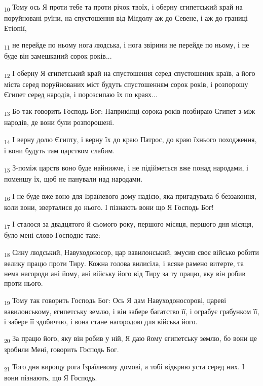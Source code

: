\begin{tcolorbox}
\textsubscript{10} Тому ось Я проти тебе та проти річок твоїх, і оберну єгипетський край на поруйновані руїни, на спустошення від Міґдолу аж до Севене, і аж до границі Етіопії,
\end{tcolorbox}
\begin{tcolorbox}
\textsubscript{11} не перейде по ньому нога людська, і нога звірини не перейде по ньому, і не буде він замешканий сорок років...
\end{tcolorbox}
\begin{tcolorbox}
\textsubscript{12} І оберну Я єгипетський край на спустошення серед спустошених країв, а його міста серед поруйнованих міст будуть спустошенням сорок років, і розпорошу Єгипет серед народів, і порозсипаю їх по краях...
\end{tcolorbox}
\begin{tcolorbox}
\textsubscript{13} Бо так говорить Господь Бог: Наприкінці сорока років позбираю Єгипет з-між народів, де вони були розпорошені.
\end{tcolorbox}
\begin{tcolorbox}
\textsubscript{14} І верну долю Єгипту, і верну їх до краю Патрос, до краю їхнього походження, і вони будуть там царством слабим.
\end{tcolorbox}
\begin{tcolorbox}
\textsubscript{15} З-поміж царств воно буде найнижче, і не підійметься вже понад народами, і поменшу їх, щоб не панували над народами.
\end{tcolorbox}
\begin{tcolorbox}
\textsubscript{16} І не буде вже воно для Ізраїлевого дому надією, яка пригадувала б беззаконня, коли вони, зверталися до нього. І пізнають вони що Я Господь Бог!
\end{tcolorbox}
\begin{tcolorbox}
\textsubscript{17} І сталося за двадцятого й сьомого року, першого місяця, першого дня місяця, було мені слово Господнє таке:
\end{tcolorbox}
\begin{tcolorbox}
\textsubscript{18} Сину людський, Навуходоносор, цар вавилонський, змусив своє військо робити велику працю проти Тиру. Кожна голова вилисіла, і всяке рамено витерте, та нема нагороди ані йому, ані війську його від Тиру за ту працю, яку він робив проти нього.
\end{tcolorbox}
\begin{tcolorbox}
\textsubscript{19} Тому так говорить Господь Бог: Ось Я дам Навуходоносорові, цареві вавилонському, єгипетську землю, і він забере багатство її, і ограбує грабунком її, і забере її здобиччю, і вона стане нагородою для війська його.
\end{tcolorbox}
\begin{tcolorbox}
\textsubscript{20} За працю його, яку він робив у ній, Я даю йому єгипетську землю, бо вони це зробили Мені, говорить Господь Бог.
\end{tcolorbox}
\begin{tcolorbox}
\textsubscript{21} Того дня вирощу рога Ізраїлевому домові, а тобі відкрию уста серед них. І вони пізнають, що Я Господь.
\end{tcolorbox}
